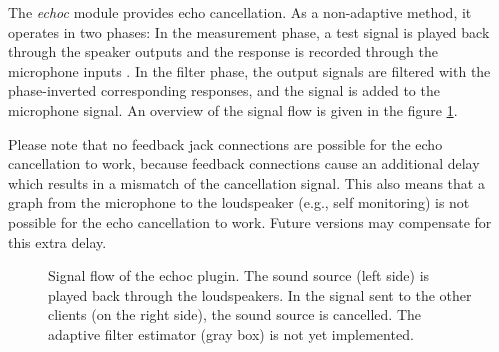 The {\em echoc} module provides echo cancellation. As a non-adaptive method, it operates in two phases: In the measurement phase, a test signal is played back through the speaker outputs  and the response is recorded through the microphone inputs . In the filter phase, the output signals are filtered with the phase-inverted corresponding responses, and the signal is added to the microphone signal. An overview of the signal flow is given in the figure \ref{fig:modechoc}.

Please note that no feedback jack connections are possible for the echo cancellation to work, because feedback connections cause an additional delay which results in a mismatch of the cancellation signal. This also means that a graph from the microphone to the loudspeaker (e.g., self monitoring) is not possible for the echo cancellation to work. Future versions may compensate for this extra delay.

\begin{figure}[htb]
    \centering
    \caption{Signal flow of the echoc plugin. The sound source (left side) is played back through the loudspeakers. In the signal sent to the other clients (on the right side), the sound source is cancelled. The adaptive filter estimator (gray box) is not yet implemented.}
    \label{fig:modechoc}
\end{figure}



